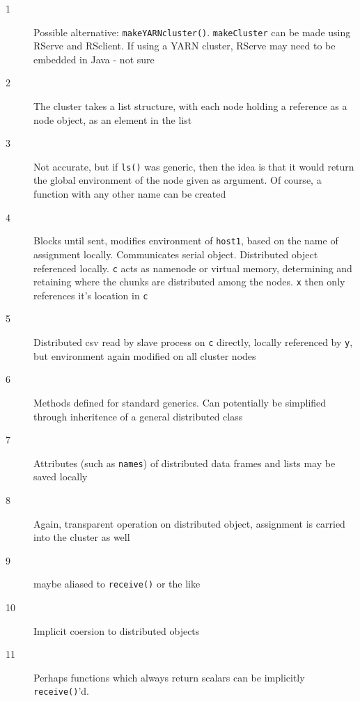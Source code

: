 \documentclass[a4paper,10pt]{article}
\begin{document}
\begin{description}
	\item[1] Possible alternative: \texttt{makeYARNcluster()}.
		\texttt{makeCluster} can be made using RServe and RSclient. If
		using a YARN cluster, RServe may need to be embedded in Java -
		not sure
	\item[2] The cluster takes a list structure, with each node holding a
		reference as a node object, as an element in the list
	\item[3] Not accurate, but if \texttt{ls()} was generic, then the idea
		is that it would return the global environment of the node
		given as argument. Of course, a function with any other name
		can be created
	\item[4] Blocks until sent, modifies environment of \texttt{host1},
		based on the name of assignment locally. Communicates serial
		object.  Distributed object referenced locally. \texttt{c} acts
		as namenode or virtual memory, determining and retaining where
		the chunks are distributed among the nodes. \texttt{x} then
		only references it's location in \texttt{c}
	\item[5] Distributed csv read by slave process on \texttt{c} directly,
		locally referenced by \texttt{y}, but environment again
		modified on all cluster nodes 
	\item[6] Methods defined for standard generics. Can potentially be
		simplified through inheritence of a general distributed class
	\item[7] Attributes (such as \texttt{names}) of distributed data frames
		and lists may be saved locally
	\item[8] Again, transparent operation on distributed object, assignment
		is carried into the cluster as well
	\item[9] maybe aliased to \texttt{receive()} or the like
	\item[10] Implicit coersion to distributed objects
	\item[11] Perhaps functions which always return scalars can be
		implicitly \texttt{receive()}'d.
\end{description}
\end{document}

